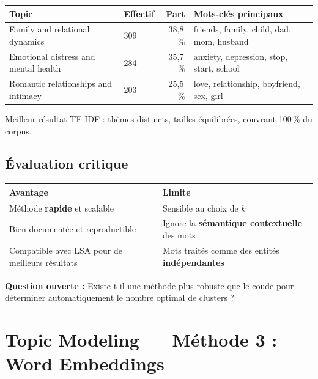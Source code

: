 \documentclass[12pt,a4paper]{article}
\begin{document}
\begin{center}
\small
\begin{tabular}{llrl}
\toprule
\textbf{Topic} & \textbf{Effectif} & \textbf{Part} & \textbf{Mots-clés principaux} \\
\midrule
Family and relational dynamics            & 309 & 38,8\,\% & friends, family, child, dad, mom, husband \\
Emotional distress and mental health      & 284 & 35,7\,\% & anxiety, depression, stop, start, school \\
Romantic relationships and intimacy       & 203 & 25,5\,\% & love, relationship, boyfriend, sex, girl \\
\bottomrule
\end{tabular}
\end{center}

Meilleur résultat TF-IDF : thèmes distincts, tailles équilibrées, couvrant 100\,\% du corpus.

\subsection{Évaluation critique}

\begin{center}
\small
\begin{tabular}{ll}
\toprule
\textbf{Avantage} & \textbf{Limite} \\
\midrule
Méthode \textbf{rapide} et scalable & Sensible au choix de $k$ \\
Bien documentée et reproductible & Ignore la \textbf{sémantique contextuelle} des mots \\
Compatible avec LSA pour de meilleurs résultats & Mots traités comme des entités \textbf{indépendantes} \\
\bottomrule
\end{tabular}
\end{center}

\textbf{Question ouverte :} Existe-t-il une méthode plus robuste que le coude pour déterminer automatiquement le nombre optimal de clusters ?

\pagebreak
\section{Topic Modeling --- Méthode 3 : Word Embeddings}
\end{document}
